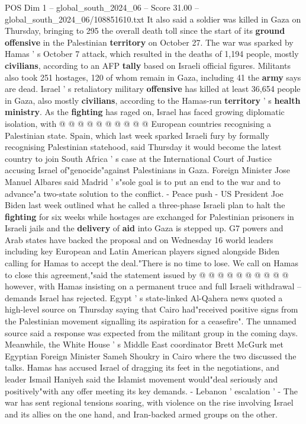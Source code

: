\begin{textsample}{POS Dim 1 – global\_south\_2024\_06 – Score 31.00 – global\_south\_2024\_06/108851610.txt}
It also said a soldier was killed in Gaza on Thursday, bringing to 295 the overall death toll since the start of its \textbf{ground} \textbf{offensive} in the Palestinian \textbf{territory} on October 27.
The war was sparked by Hamas ' s October 7 attack, which resulted in the deaths of 1,194 people, mostly \textbf{civilians}, according to an AFP \textbf{tally} based on Israeli official figures.
Militants also took 251 hostages, 120 of whom remain in Gaza, including 41 the \textbf{army} says are dead.
Israel ' s retaliatory military \textbf{offensive} has killed at least 36,654 people in Gaza, also mostly \textbf{civilians}, according to the Hamas-run \textbf{territory} ' s \textbf{health} \textbf{ministry}.
As the \textbf{fighting} has raged on, Israel has faced growing diplomatic isolation, with @ @ @ @ @ @ @ @ @ @ European countries recognising a Palestinian state.
Spain, which last week sparked Israeli fury by formally recognising Palestinian statehood, said Thursday it would become the latest country to join South Africa ' s case at the International Court of Justice accusing Israel of"genocide"against Palestinians in Gaza.
Foreign Minister Jose Manuel Albares said Madrid ' s"sole goal is to put an end to the war and to advance"a two-state solution to the conflict. - Peace push - US President Joe Biden last week outlined what he called a three-phase Israeli plan to halt the \textbf{fighting} for six weeks while hostages are exchanged for Palestinian prisoners in Israeli jails and the \textbf{delivery} of \textbf{aid} into Gaza is stepped up.
G7 powers and Arab states have backed the proposal and on Wednesday 16 world leaders including key European and Latin American players signed alongside Biden calling for Hamas to accept the deal."There is no time to lose.
We call on Hamas to close this agreement,"said the statement issued by @ @ @ @ @ @ @ @ @ @ however, with Hamas insisting on a permanent truce and full Israeli withdrawal -- demands Israel has rejected.
Egypt ' s state-linked Al-Qahera news quoted a high-level source on Thursday saying that Cairo had"received positive signs from the Palestinian movement signalling its aspiration for a ceasefire".
The unnamed source said a response was expected from the militant group in the coming days.
Meanwhile, the White House ' s Middle East coordinator Brett McGurk met Egyptian Foreign Minister Sameh Shoukry in Cairo where the two discussed the talks.
Hamas has accused Israel of dragging its feet in the negotiations, and leader Ismail Haniyeh said the Islamist movement would"deal seriously and positively"with any offer meeting its key demands. - Lebanon ' escalation ' - The war has sent regional tensions soaring, with violence on the rise involving Israel and its allies on the one hand, and Iran-backed armed groups on the other.

\end{textsample}
